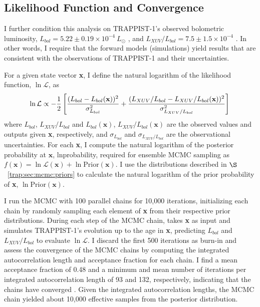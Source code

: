 \subsection{Likelihood Function and Convergence} \label{trap:sec:mcmc:like}

I further condition this analysis on TRAPPIST-1's observed bolometric luminosity, $L_{bol} = 5.22 \pm{0.19} \times 10^{-4} \ L_{\odot}$ \citep[][but see also \citet{Gonzales2019}]{vanGrootel2018}, and $L_{XUV}/L_{bol} = 7.5 \pm{1.5} \times 10^{-4}$ \citep{Wheatley2017}. In other words, I require that the forward models (\vplanet simulations) yield results that are consistent with the observations of TRAPPIST-1 and their uncertainties. 

For a given state vector \textbf{x}, I define the natural logarithm of the likelihood function, $\ln \mathcal{L}$, as
\small
\begin{equation} \label{trap:eqn:lnlike}
    \ln \mathcal{L} \propto -\frac{1}{2} \left[ \frac{(L_{bol} - L_{bol}(\textbf{x}))^2}{\sigma_{L_{bol}}^2} + \frac{(L_{XUV}/L_{bol} - L_{XUV}/L_{bol}(\textbf{x}))^2}{\sigma_{L_{XUV}/L_{bol}}^2} \right] \\
\end{equation}
\normalsize
where $L_{bol}$, $L_{XUV}/L_{bol}$ and $L_{bol}(\textbf{x})$, $L_{XUV}/L_{bol}(\textbf{x})$ are the observed values and \vplanet outputs given \textbf{x}, respectively, and $\sigma_{L_{bol}}$ and $\sigma_{L_{XUV}/L_{bol}}$ are the observational uncertainties. For each \textbf{x}, I compute the natural logarithm of the posterior probability at $\textbf{x}$, lnprobability, required for ensemble MCMC sampling as $f(\textbf{x}) = \ln \mathcal{L}(\textbf{x}) + \ln \mathrm{Prior}(\textbf{x})$. I use the distributions described in $\S$~\ref{trap:sec:mcmc:priors} to calculate the natural logarithm of the prior probability of \textbf{x}, $\ln \mathrm{Prior}(\textbf{x})$. 

I run the MCMC with 100 parallel chains for 10,000 iterations, initializing each chain by randomly sampling each element of \textbf{x} from their respective prior distributions. During each step of the MCMC chain, \vplanet takes \textbf{x} as input and simulates TRAPPIST-1's evolution up to the age in \textbf{x}, predicting $L_{bol}$ and $L_{XUV}/L_{bol}$ to evaluate $\ln \mathcal{L}$. I discard the first 500 iterations as burn-in and assess the convergence of the MCMC chains by computing the integrated autocorrelation length and acceptance fraction for each chain. I find a mean acceptance fraction of 0.48 and a minimum and mean number of iterations per integrated autocorrelation length of 93 and 132, respectively, indicating that the chains have converged \citep{ForemanMackey2013}. Given the integrated autocorrelation lengths, the MCMC chain yielded about 10,000 effective samples from the posterior distribution.

